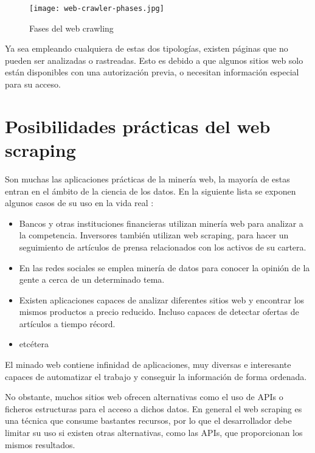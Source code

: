 \begin{figure}[tphb]
\centering
\texttt{[image: web-crawler-phases.jpg]}
\caption{Fases del web crawling}
\label{img:web-crawler-phases}
\end{figure}

Ya sea empleando cualquiera de estas dos tipologías, existen páginas que no pueden ser analizadas o
rastreadas. Esto es debido a que algunos sitios web solo están disponibles con una autorización previa, o
necesitan información especial para su acceso.

\section{Posibilidades prácticas del web scraping}
\label{sec:posibilidades practicas del web scraping}
Son muchas las aplicaciones prácticas de la minería web, la mayoría de estas entran en el ámbito de la
ciencia de los datos. En la siguiente lista se exponen algunos casos de su uso en la vida real
\cite{web-scraping-seppe}:

\begin{itemize}
\item Bancos y otras instituciones financieras utilizan minería web para analizar a la competencia.
Inversores también utilizan web scraping, para hacer un seguimiento de artículos de prensa relacionados
con los activos de su cartera.

\item En las redes sociales se emplea minería de datos para conocer la opinión de la gente a cerca de un
determinado tema.

\item Existen aplicaciones capaces de analizar diferentes sitios web y encontrar los mismos productos a
precio reducido. Incluso capaces de detectar ofertas de artículos a tiempo récord.

\item etcétera
\end{itemize}

El minado web contiene infinidad de aplicaciones, muy diversas e interesante capaces de automatizar el
trabajo y conseguir la información de forma ordenada.

No obstante, muchos sitios web ofrecen alternativas como el uso de APIs o ficheros estructuras para el
acceso a dichos datos. En general el web scraping es una técnica que consume bastantes recursos, por lo
que el desarrollador debe limitar su uso si existen otras alternativas, como las APIs, que proporcionan
los mismos resultados.

